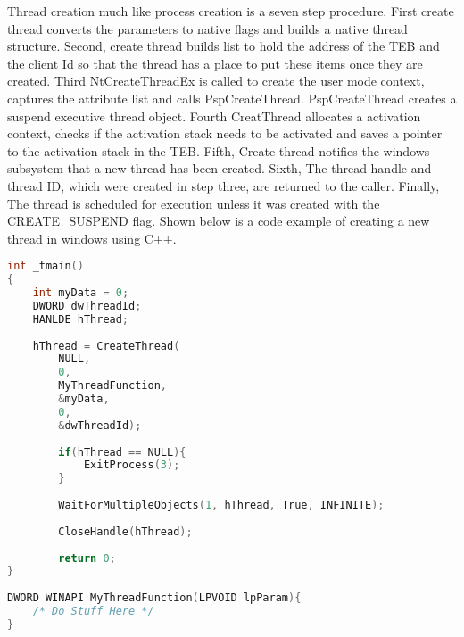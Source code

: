 \documentclass[letterpaper, onecolumn,10pt]{IEEEtran}
\begin{document}
				Thread creation much like process creation is a seven step procedure. First create thread converts the parameters to native flags and builds a native thread structure. Second, create thread builds list to hold the address of the TEB and the client Id so that the thread has a place to put these items once they are created. Third NtCreateThreadEx is called to create the user mode context, captures the attribute list and calls PspCreateThread. PspCreateThread creates a suspend executive thread object. Fourth CreatThread allocates a activation context, checks if the activation stack needs to be activated and saves a pointer to the activation stack in the TEB. Fifth, Create thread notifies the windows subsystem that a new thread has been created. Sixth, The thread handle and thread ID, which were created in step three, are returned to the caller. Finally, The thread is scheduled for execution unless it was created with the CREATE\_SUSPEND flag\cite{Windows}. Shown below is a code example of creating a new thread in windows using C++\cite{WindowsMan}.\\
\newpage
\begin{center}
\begin{lstlisting}[float, language=C++]
int _tmain()
{
	int myData = 0;
	DWORD dwThreadId;
	HANLDE hThread;
							
	hThread = CreateThread(
		NULL,
		0,
		MyThreadFunction,
		&myData,
		0,
		&dwThreadId);
								
		if(hThread == NULL){
			ExitProcess(3);
		}
								
		WaitForMultipleObjects(1, hThread, True, INFINITE);
								
		CloseHandle(hThread);
								
		return 0;
}
					
DWORD WINAPI MyThreadFunction(LPVOID lpParam){
	/* Do Stuff Here */
}
				\end{lstlisting}
			\end{center}
			
			
\end{document}
